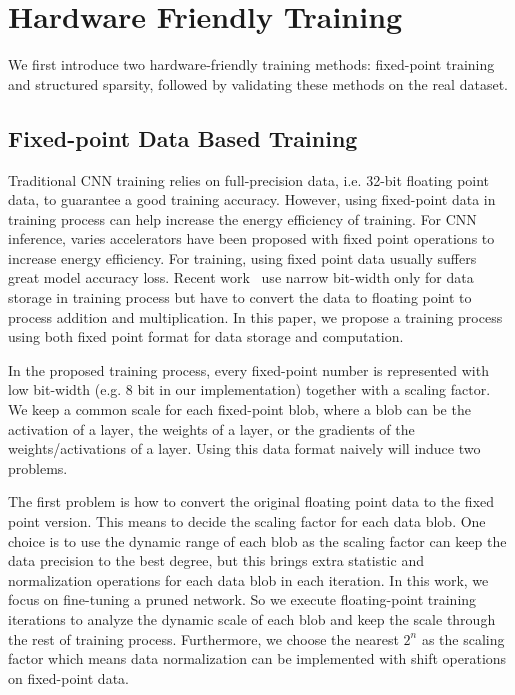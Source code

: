\section{Hardware Friendly Training}\label{sec:training}

We first introduce two hardware-friendly training methods: fixed-point training and structured sparsity, followed by validating these methods on the real dataset.

\subsection{Fixed-point Data Based Training}
Traditional CNN training relies on full-precision data, i.e. 32-bit floating point data, to guarantee a good training accuracy. However, using fixed-point data in training process can help increase the energy efficiency of training. For CNN inference, varies accelerators have been proposed with fixed point operations to increase energy efficiency. For training, using fixed point data usually suffers great model accuracy loss. Recent work~\cite{Zhou2016DoReFa} use narrow bit-width only for data storage in training process but have to convert the data to floating point to process addition and multiplication. In this paper, we propose a training process using both fixed point format for data storage and computation. 

In the proposed training process, every fixed-point number is represented with low bit-width (e.g. 8 bit in our implementation) together with a scaling factor. We keep a common scale for each fixed-point blob, where a blob can be the activation of a layer, the weights of a layer, or the gradients of the weights/activations of a layer. Using this data format naively will induce two problems.

The first problem is how to convert the original floating point data to the fixed point version. This means to decide the scaling factor for each data blob. One choice is to use the dynamic range of each blob as the scaling factor can keep the data precision to the best degree, but this brings extra statistic and normalization operations for each data blob in each iteration. In this work, we focus on fine-tuning a pruned network. 
So we execute floating-point training iterations to analyze the dynamic scale of each blob and keep the scale through the rest of training process. Furthermore, we choose the nearest $2^n$ as the scaling factor which means data normalization can be implemented with shift operations on fixed-point data.

